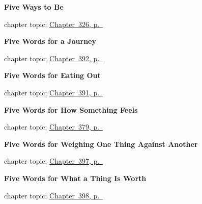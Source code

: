 \noindent\begin{minipage}[t]{\linewidth}
\raggedright
\textbf{Five Ways to Be}\par
\footnotesize chapter topic; \hyperref[ch:nervioso-y-listo]{Chapter~326, p.~\pageref*{ch:nervioso-y-listo}}
\end{minipage}\par\smallskip

\noindent\begin{minipage}[t]{\linewidth}
\raggedright
\textbf{Five Words for a Journey}\par
\footnotesize chapter topic; \hyperref[ch:el-aeropuerto-y-las-vacaciones]{Chapter~392, p.~\pageref*{ch:el-aeropuerto-y-las-vacaciones}}
\end{minipage}\par\smallskip

\noindent\begin{minipage}[t]{\linewidth}
\raggedright
\textbf{Five Words for Eating Out}\par
\footnotesize chapter topic; \hyperref[ch:el-menu-y-el-camarero]{Chapter~391, p.~\pageref*{ch:el-menu-y-el-camarero}}
\end{minipage}\par\smallskip

\noindent\begin{minipage}[t]{\linewidth}
\raggedright
\textbf{Five Words for How Something Feels}\par
\footnotesize chapter topic; \hyperref[ch:seco-y-mojado]{Chapter~379, p.~\pageref*{ch:seco-y-mojado}}
\end{minipage}\par\smallskip

\noindent\begin{minipage}[t]{\linewidth}
\raggedright
\textbf{Five Words for Weighing One Thing Against Another}\par
\footnotesize chapter topic; \hyperref[ch:barato-y-caro]{Chapter~397, p.~\pageref*{ch:barato-y-caro}}
\end{minipage}\par\smallskip

\noindent\begin{minipage}[t]{\linewidth}
\raggedright
\textbf{Five Words for What a Thing Is Worth}\par
\footnotesize chapter topic; \hyperref[ch:importante-y-facil]{Chapter~398, p.~\pageref*{ch:importante-y-facil}}
\end{minipage}\par\smallskip

